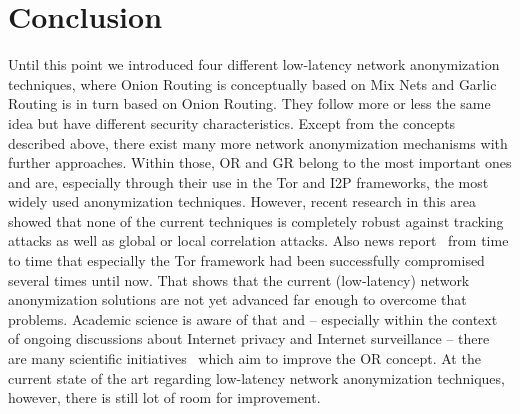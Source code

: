 \documentclass{sig-alternate}
\begin{document}
\section{Conclusion}
Until this point we introduced four different low-latency network anonymization techniques, where Onion Routing is conceptually based on Mix Nets and Garlic Routing is in turn based on Onion Routing. They follow more or less the same idea but have different security characteristics. Except from the concepts described above, there exist many more network anonymization mechanisms with further approaches. Within those, OR and GR belong to the most important ones and are, especially through their use in the Tor and I2P frameworks, the most widely used anonymization techniques. However, recent research in this area showed that none of the current techniques is completely robust against tracking attacks as well as global or local correlation attacks. Also news report~\cite{torhacked} from time to time that especially the Tor framework had been successfully compromised several times until now. That shows that the current (low-latency) network anonymization solutions are not yet advanced far enough to overcome that problems. Academic science is aware of that and -- especially within the context of ongoing discussions about Internet privacy and Internet surveillance -- there are many scientific initiatives~\cite{ORpublications} which aim to improve the OR concept. At the current state of the art regarding low-latency network anonymization techniques, however, there is still lot of room for improvement.

\newpage


\end{document}
